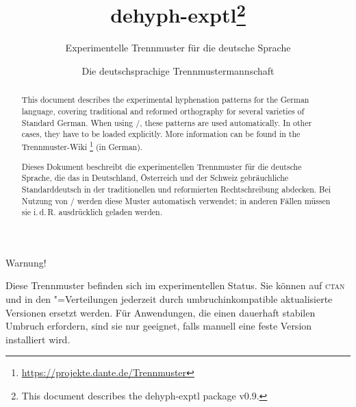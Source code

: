 \documentclass[11pt,
               DIV=9,
               toc=flat,
               captions=tableheading,
               abstract=on]{scrartcl}
\newcommand*{\Abk}[1]{\mbox{\textsc{\lsstyle#1}}}
\newcommand*{\Paket}[1]{\textsf{#1}}
\begin{document}


\author{Die deutschsprachige Trennmustermannschaft}
\title{\Paket{dehyph-exptl}\thanks{This document describes the
    \Paket{dehyph-exptl} package v0.9.}}
\subtitle{Experimentelle Trennmuster für die deutsche Sprache}
\maketitle

\begin{abstract}
  This document describes the experimental hyphenation patterns for
  the German language, covering traditional and reformed orthography
  for several varieties of Standard German.  When using
  /, these patterns are used
  automatically.  In other cases, they have to be loaded explicitly.
  More information can be found in the Trennmuster-Wiki%
  \footnote{\url{https://projekte.dante.de/Trennmuster}} (in German).
\end{abstract}

\begin{abstract}
  Dieses Dokument beschreibt die experimentellen Trennmuster für die
  deutsche Sprache, die das in Deutschland, Österreich und der Schweiz
  gebräuchliche Standarddeutsch in der traditionellen und reformierten
  Rechtschreibung abdecken.  Bei Nutzung von
  / werden diese Muster automatisch
  verwendet; in anderen Fällen müssen sie i.\,d.\,R. ausdrücklich
  geladen werden.
\end{abstract}

\vfill
\begingroup
\em\large

\begin{center}
  Warnung!
\end{center}

Diese Trennmuster befinden sich im experimentellen Status.  Sie können
auf \Abk{ctan} und in den "=Verteilungen jederzeit
durch umbruchinkompatible aktualisierte Versionen ersetzt werden.  Für
Anwendungen, die einen dauerhaft stabilen Umbruch erfordern, sind sie
nur geeignet, falls manuell eine feste Version installiert wird.
\endgroup \vfill
\end{document}
